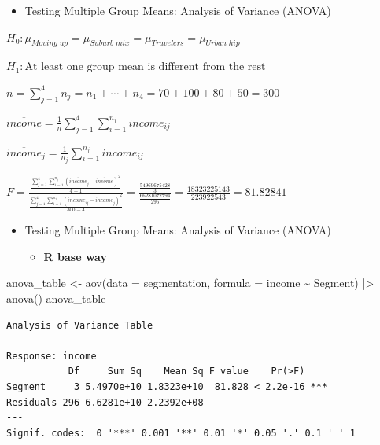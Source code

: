 \documentclass[
  ignorenonframetext,
]{beamer}
\newenvironment{Shaded}{\begin{snugshade}}{\end{snugshade}}
\newcommand{\AttributeTok}[1]{\textcolor[rgb]{0.40,0.45,0.13}{#1}}
\newcommand{\FunctionTok}[1]{\textcolor[rgb]{0.28,0.35,0.67}{#1}}
\newcommand{\NormalTok}[1]{\textcolor[rgb]{0.00,0.23,0.31}{#1}}
\newcommand{\OtherTok}[1]{\textcolor[rgb]{0.00,0.23,0.31}{#1}}
\newcommand{\SpecialCharTok}[1]{\textcolor[rgb]{0.37,0.37,0.37}{#1}}
\providecommand{\tightlist}{%
  \setlength{\itemsep}{0pt}\setlength{\parskip}{0pt}}\usepackage{longtable,booktabs,array}
\begin{document}
\begin{frame}{}
\label{section-24}
\begin{itemize}
\tightlist
\item
  Testing Multiple Group Means: Analysis of Variance (ANOVA)
\end{itemize}

\(H_0: \mu_{Moving\;up} = \mu_{Suburb\;mix} = \mu_{Travelers} = \mu_{Urban\;hip}\)

\(H_1: \text{At least one group mean is different from the rest}\)

\(n = \sum_{j=1}^4 n_j = n_1 + \cdots + n_4 = 70 + 100 + 80 + 50 = 300\)

\(\overline{income} = \frac{1}{n} \sum_{j=1}^4 \sum_{i=1}^{n_j} income_{ij}\)

\(\overline{income}_j = \frac{1}{n_j} \sum_{i=1}^{n_j} income_{ij}\)

\(F = \frac{\frac{\sum_{j=1}^4 \sum_{i=1}^{n_j} (\overline{income}_j - \overline{income})^2}{4-1}}{\frac{\sum_{j=1}^4 \sum_{i=1}^{n_j} (income_{ij} - \overline{income}_j)^2}{300 - 4}} = \frac{\frac{54969675428}{3}}{\frac{66281072794}{296}} = \frac{18323225143}{223922543} = 81.82841\)
\end{frame}

\begin{frame}[fragile]{}
\label{section-25}
\begin{itemize}
\item
  Testing Multiple Group Means: Analysis of Variance (ANOVA)

  \begin{itemize}
  \tightlist
  \item
    \textbf{R base way}
  \end{itemize}
\end{itemize}

\tiny

\begin{Shaded}
\begin{Highlighting}[]
\NormalTok{anova\_table }\OtherTok{\textless{}{-}} \FunctionTok{aov}\NormalTok{(}\AttributeTok{data =}\NormalTok{ segmentation, }\AttributeTok{formula =}\NormalTok{ income }\SpecialCharTok{\textasciitilde{}}\NormalTok{ Segment) }\SpecialCharTok{|\textgreater{}}
  \FunctionTok{anova}\NormalTok{()}
\NormalTok{anova\_table}
\end{Highlighting}
\end{Shaded}

\begin{verbatim}
Analysis of Variance Table

Response: income
           Df     Sum Sq    Mean Sq F value    Pr(>F)    
Segment     3 5.4970e+10 1.8323e+10  81.828 < 2.2e-16 ***
Residuals 296 6.6281e+10 2.2392e+08                      
---
Signif. codes:  0 '***' 0.001 '**' 0.01 '*' 0.05 '.' 0.1 ' ' 1
\end{verbatim}
\end{frame}
\end{document}
